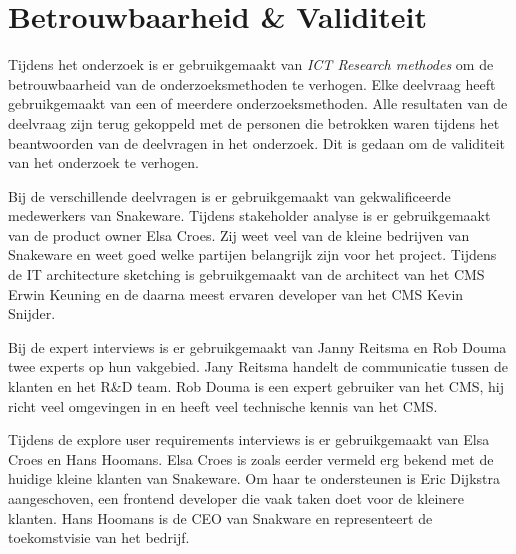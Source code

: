 \section{Betrouwbaarheid \& Validiteit}
Tijdens het onderzoek is er gebruikgemaakt van \textit{ICT Research methodes} om de betrouwbaarheid van de onderzoeksmethoden te verhogen.
Elke deelvraag heeft gebruikgemaakt van een of meerdere onderzoeksmethoden.
Alle resultaten van de deelvraag zijn terug gekoppeld met de personen die betrokken waren tijdens het beantwoorden van de deelvragen in het onderzoek.
Dit is gedaan om de validiteit van het onderzoek te verhogen.

\whitespace
Bij de verschillende deelvragen is er gebruikgemaakt van gekwalificeerde medewerkers van Snakeware.
Tijdens stakeholder analyse is er gebruikgemaakt van de product owner Elsa Croes.
Zij weet veel van de kleine bedrijven van Snakeware en weet goed welke partijen belangrijk zijn voor het  project.
Tijdens de IT architecture sketching is gebruikgemaakt van de architect van het CMS Erwin Keuning en de daarna meest ervaren developer van het CMS Kevin Snijder.

Bij de expert interviews is er gebruikgemaakt van Janny Reitsma en Rob Douma twee experts op hun vakgebied.
Jany Reitsma handelt de communicatie tussen de klanten en het R\&D team.
Rob Douma is een expert gebruiker van het CMS, hij richt veel omgevingen in en heeft veel technische kennis van het CMS.

Tijdens de explore user requirements interviews is er gebruikgemaakt van Elsa Croes en Hans Hoomans.
Elsa Croes is zoals eerder vermeld erg bekend met de huidige kleine klanten van Snakeware.
Om haar te ondersteunen is Eric Dijkstra aangeschoven, een frontend developer die vaak taken doet voor de kleinere klanten.
Hans Hoomans is de CEO van Snakware en representeert de toekomstvisie van het bedrijf.
%
